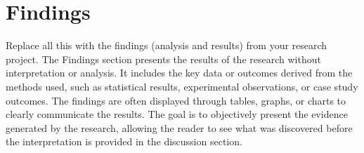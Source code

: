 \section{Findings}
\label{Findings}

Replace all this with the findings (analysis and results) from your research project.  The Findings section presents the results of the research without interpretation or analysis. It includes the key data or outcomes derived from the methods used, such as statistical results, experimental observations, or case study outcomes. The findings are often displayed through tables, graphs, or charts to clearly communicate the results. The goal is to objectively present the evidence generated by the research, allowing the reader to see what was discovered before the interpretation is provided in the discussion section. 

